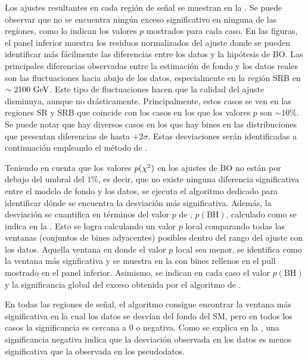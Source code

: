 Los ajustes resultantes en cada región de señal se muestran en la \Fig{\ref{fig:results:results:bkgonly:fits}}. Se puede observar que no se encuentra ningún exceso significativo en ninguna de las regiones, como lo indican los valores \(p\) mostrados para cada caso. En las figuras, el panel inferior muestra los residuos normalizados del ajuste donde se pueden identificar más fácilmente las diferencias entre los datos y la hipótesis de \ac{BO}. Las principales diferencias observadas entre la estimación de fondo y los datos reales son las fluctuaciones hacia abajo de los datos, especialmente en la región SRB en \(\sim 2100~\text{GeV}\). Este tipo de fluctuaciones hacen que la calidad del ajuste disminuya, aunque no drásticamente. Principalmente, estos casos se ven en las regiones SR y SRB que coincide con los casos en los que los valores \(p\) son \(\sim 10\%\).
Se puede notar que hay diversos casos en los que hay bines en las distribuciones que presentan diferencias de hasta \(+2\sigma\). Estas desviaciones serán identificadas a continuación empleando el método de \bh.


Teniendo en cuenta que los valores \(p(\chi^{2})\) en los ajustes de \ac{BO} no están por debajo del umbral del \(1\%\), es decir, que no existe ninguna diferencia significativa entre el modelo de fondo y los datos, se ejecuta el algoritmo dedicado \bh para identificar dónde se encuentra la desviación más significativa. Además, la desviación se cuantifica en términos del valor \(p\) de \bh, \(p \left(\text{BH}\right)\), calculado como se indica en la \Eqn{\ref{eq:strategy:stat_treatment:bh:bh_pval}}. Esto se logra calculando un valor \(p\) local comparando todas las ventanas (conjuntos de bines adyacentes) posibles dentro del rango del ajuste con los datos. Aquella ventana en donde el valor \(p\) local sea menor, se identifica como la ventana más signficativa y se muestra en la \Fig{\ref{fig:results:results:bkgonly:fits}} con bines rellenos en el pull mostrado en el panel inferior. Asimismo, se indican en cada caso el valor \(p \left(\text{BH}\right)\) y la significancia global del exceso obtenida por el algoritmo de \bh.


En todas las regiones de señal, el algoritmo \bh consigue encontrar la ventana más significativa en la cual los datos se desvían del fondo del \ac{SM}, pero en todos los casos la significancia es cercana a 0 o negativa. Como se explica en la \Sect{\ref{subsec:strategy:stat_treatment:bh}}, una significancia negativa indica que la desviación observada en los datos es menos significativa que la observada en los pseudodatos.

